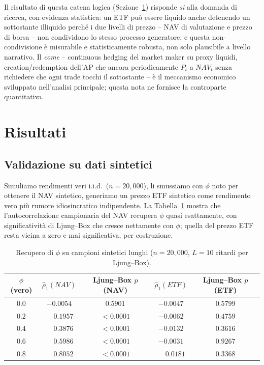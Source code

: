 \documentclass[11pt]{article}
\begin{document}
Il risultato di questa catena logica (Sezione~\ref{sec:results}) risponde \emph{sì} alla domanda di ricerca, con evidenza statistica: un ETF pu\`o essere liquido anche detenendo un sottostante illiquido perch\'e i due livelli di prezzo -- NAV di valutazione e prezzo di borsa -- non condividono lo stesso processo generatore, e questa non-condivisione \`e misurabile e statisticamente robusta, non solo plausibile a livello narrativo. Il \emph{come} -- continuous hedging del market maker su proxy liquidi, creation/redemption dell'AP che ancora periodicamente $P_t$ a $NAV_t$ senza richiedere che ogni trade tocchi il sottostante -- \`e il meccanismo economico sviluppato nell'analisi principale; questa nota ne fornisce la controparte quantitativa.

\section{Risultati}
\label{sec:results}

\subsection{Validazione su dati sintetici}
\label{sec:results-synth}

Simuliamo rendimenti veri i.i.d.\ ($n=20{,}000$), li smussiamo con $\phi$ noto per ottenere il NAV sintetico, generiamo un prezzo ETF sintetico come rendimento vero pi\`u rumore idiosincratico indipendente. La Tabella~\ref{tab:validation} mostra che l'autocorrelazione campionaria del NAV recupera $\phi$ quasi esattamente, con significativit\`a di Ljung--Box che cresce nettamente con $\phi$; quella del prezzo ETF resta vicina a zero e mai significativa, per costruzione.

\begin{table}[H]
\centering
\caption{Recupero di $\phi$ su campioni sintetici lunghi ($n=20{,}000$, $L=10$ ritardi per Ljung--Box).}
\label{tab:validation}
\begin{tabular}{ccccc}
\toprule
$\phi$ (vero) & $\hat\rho_1(NAV)$ & Ljung--Box $p$ (NAV) & $\hat\rho_1(ETF)$ & Ljung--Box $p$ (ETF) \\
\midrule
$0.0$ & $-0.0054$ & $0.5901$ & $-0.0047$ & $0.5799$ \\
$0.2$ & $\phantom{-}0.1957$ & $<0.0001$ & $-0.0062$ & $0.4759$ \\
$0.4$ & $\phantom{-}0.3876$ & $<0.0001$ & $-0.0132$ & $0.3616$ \\
$0.6$ & $\phantom{-}0.5986$ & $<0.0001$ & $-0.0031$ & $0.9267$ \\
$0.8$ & $\phantom{-}0.8052$ & $<0.0001$ & $\phantom{-}0.0181$ & $0.3368$ \\
\bottomrule
\end{tabular}
\end{table}
\end{document}
